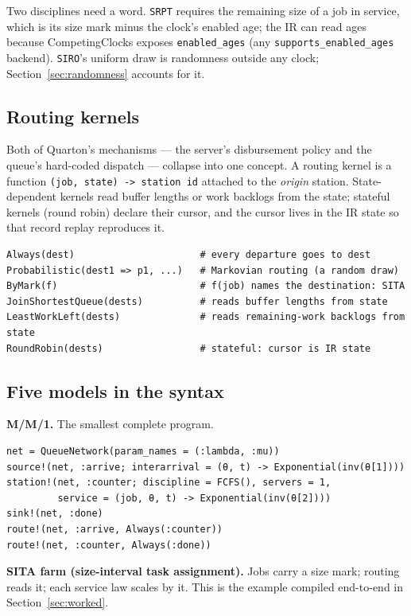 \documentclass[11pt]{article}
\newcommand{\code}[1]{\texttt{#1}}
\begin{document}
Two disciplines need a word. \code{SRPT} requires the remaining size of a job
in service, which is its size mark minus the clock's enabled age; the IR can
read ages because CompetingClocks exposes \code{enabled\_ages} (any
\code{supports\_enabled\_ages} backend). \code{SIRO}'s uniform draw is
randomness outside any clock; Section~\ref{sec:randomness} accounts for it.

\subsection{Routing kernels}

Both of Quarton's mechanisms --- the server's disbursement policy and the
queue's hard-coded dispatch --- collapse into one concept. A routing kernel is
a function \code{(job, state) -> station id} attached to the \emph{origin}
station. State-dependent kernels read buffer lengths or work backlogs from the
state; stateful kernels (round robin) declare their cursor, and the cursor
lives in the IR state so that record replay reproduces it.

\begin{lstlisting}
Always(dest)                      # every departure goes to dest
Probabilistic(dest1 => p1, ...)   # Markovian routing (a random draw)
ByMark(f)                         # f(job) names the destination: SITA
JoinShortestQueue(dests)          # reads buffer lengths from state
LeastWorkLeft(dests)              # reads remaining-work backlogs from state
RoundRobin(dests)                 # stateful: cursor is IR state
\end{lstlisting}

\subsection{Five models in the syntax}

\textbf{M/M/1.} The smallest complete program.

\begin{lstlisting}
net = QueueNetwork(param_names = (:lambda, :mu))
source!(net, :arrive; interarrival = (θ, t) -> Exponential(inv(θ[1])))
station!(net, :counter; discipline = FCFS(), servers = 1,
         service = (job, θ, t) -> Exponential(inv(θ[2])))
sink!(net, :done)
route!(net, :arrive, Always(:counter))
route!(net, :counter, Always(:done))
\end{lstlisting}

\textbf{SITA farm (size-interval task assignment).} Jobs carry a size mark;
routing reads it; each service law scales by it. This is the example compiled
end-to-end in Section~\ref{sec:worked}.
\end{document}
